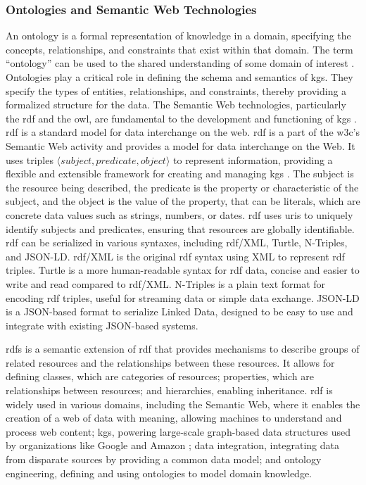 \subsubsection*{Ontologies and Semantic Web Technologies}
An ontology is a formal representation of knowledge in a domain, specifying the concepts, relationships, and constraints that exist within that domain. The term ``ontology'' can be used to the shared understanding of some domain of interest \cite{Uschold1996}.
Ontologies play a critical role in defining the schema and semantics of \glspl{kg}. They specify the types of entities, relationships, and constraints, thereby providing a formalized structure for the data. The Semantic Web technologies, particularly the \gls{rdf} and the \gls{owl}, are fundamental to the development and functioning of \glspl{kg} \cite{Antoniou2008}.
\\\gls{rdf} is a standard model for data interchange on the web.
\gls{rdf} is a part of the \gls{w3c}'s Semantic Web activity and provides a model for data interchange on the Web.
It uses triples $\langle subject,predicate,object \rangle$ to represent information, providing a flexible and extensible framework for creating and managing \glspl{kg} \cite{Cyganiak14RCA}.
The subject is the resource being described, the predicate is the property or characteristic of the subject, and the object is the value of the property, that can be literals, which are concrete data values such as strings, numbers, or dates.
\gls{rdf} uses \glspl{uri} to uniquely identify subjects and predicates, ensuring that resources are globally identifiable.
\gls{rdf} can be serialized in various syntaxes, including \gls{rdf}/XML, Turtle, N-Triples, and JSON-LD. \gls{rdf}/XML is the original \gls{rdf} syntax using XML to represent \gls{rdf} triples. Turtle is a more human-readable syntax for \gls{rdf} data, concise and easier to write and read compared to \gls{rdf}/XML. N-Triples is a plain text format for encoding \gls{rdf} triples, useful for streaming data or simple data exchange. JSON-LD is a JSON-based format to serialize Linked Data, designed to be easy to use and integrate with existing JSON-based systems.

\gls{rdfs} is a semantic extension of \gls{rdf} that provides mechanisms to describe groups of related resources and the relationships between these resources. It allows for defining classes, which are categories of resources; properties, which are relationships between resources; and hierarchies, enabling inheritance.
\gls{rdf} is widely used in various domains, including the Semantic Web, where it enables the creation of a web of data with meaning, allowing machines to understand and process web content; \glspl{kg}, powering large-scale graph-based data structures used by organizations like Google and Amazon \cite{Kejriwal2022}; data integration, integrating data from disparate sources by providing a common data model; and ontology engineering, defining and using ontologies to model domain knowledge.

